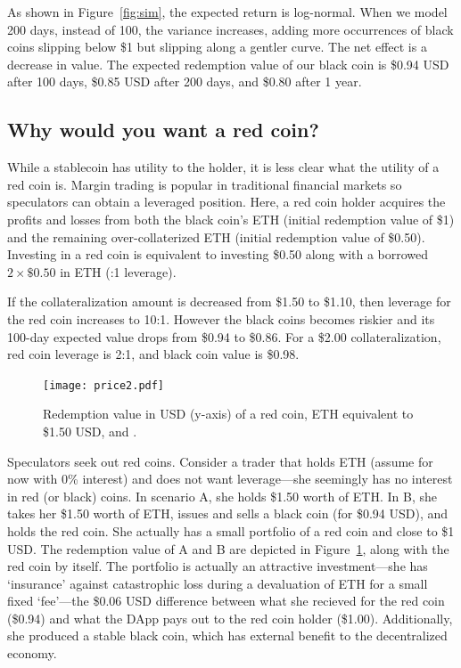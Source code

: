 As shown in Figure~\ref{fig:sim}, the expected return is log-normal. When we model 200 days, instead of 100, the variance increases, adding more occurrences of black coins slipping below \$1 but slipping along a gentler curve. The net effect is a decrease in value. The expected redemption value of our black coin is \$0.94 USD after 100 days, \$0.85 USD after 200 days, and \$0.80 after 1 year. 


\subsection{Why would you want a red coin?}

While a stablecoin has utility to the holder, it is less clear what the utility of a red coin is. Margin trading is popular in traditional financial markets so speculators can obtain a leveraged position. Here, a red coin holder acquires the profits and losses from both the black coin's ETH (initial redemption value of \$1) and the remaining over-collaterized ETH (initial redemption value of \$0.50). Investing in a red coin is equivalent to investing \$0.50 along with a borrowed $2\times\$0.50$ in ETH (:1 leverage). 

If the collateralization amount is decreased from \$1.50 to \$1.10, then leverage for the red coin increases to 10:1. However the black coins becomes riskier and its 100-day expected value drops from \$0.94 to \$0.86. For a \$2.00 collateralization, red coin leverage is 2:1, and black coin value is \$0.98. 

\begin{figure}[t]
\centering
\texttt{[image: price2.pdf]}
\caption{Redemption value in USD (y-axis) of a red coin, ETH equivalent to \$1.50 USD, and .\label{fig:price2}}
\end{figure}

Speculators seek out red coins. Consider a trader that holds ETH (assume for now with 0\% interest) and does not want leverage---she seemingly has no interest in red (or black) coins. In scenario A, she holds \$1.50 worth of ETH. In B, she takes her \$1.50 worth of ETH, issues and sells a black coin (\eg for \$0.94 USD), and holds the red coin. She actually has a small portfolio of a red coin and close to \$1 USD. The redemption value of A and B are depicted in Figure~\ref{fig:price2}, along with the red coin by itself. The portfolio is actually an attractive investment---she has `insurance' against catastrophic loss during a devaluation of ETH for a small fixed `fee'---the \$0.06 USD difference between what she recieved for the red coin (\$0.94) and what the DApp pays out to the red coin holder (\$1.00). Additionally, she produced a stable black coin, which has external benefit to the decentralized economy. 

